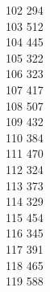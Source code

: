 { 102	294 \\
 103	512 \\
 104	445 \\
 105	322 \\
 106	323 \\
 107	417 \\
 108	507 \\
 109	432 \\
 110	384 \\
 111	470 \\
 112	324 \\
 113	373 \\
 114	329 \\
 115	454 \\
 116	345 \\
 117	391 \\
 118	465 \\
 119	588 \\
}
